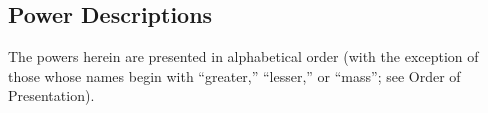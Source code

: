 




\clearpage
\begin{strip}
\section{Power Descriptions}
The powers herein are presented in alphabetical order (with the exception of those whose names begin with ``greater,'' ``lesser,'' or ``mass''; see Order of Presentation).
\end{strip}


